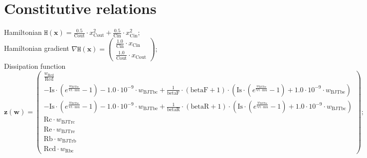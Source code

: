 \documentclass[11pt, oneside]{article}      %
\begin{document}
\section{Constitutive relations}
%
Hamiltonian $ \mathtt{H}(\mathbf{x}) = \frac{0.5}{\mathrm{Cout}} \cdot x_{\mathrm{Cout}}^{2} + \frac{0.5}{\mathrm{Cin}} \cdot x_{\mathrm{Cin}}^{2} ; $ 
%
\\
%
Hamiltonian gradient $ \nabla \mathtt{H}(\mathbf{x}) = \left(\begin{array}{c}\frac{1.0}{\mathrm{Cin}} \cdot x_{\mathrm{Cin}}\\\frac{1.0}{\mathrm{Cout}} \cdot x_{\mathrm{Cout}}\end{array}\right) ; $ 
%
\\
%
Dissipation function $ \mathbf{z}(\mathbf{w}) = \left(\begin{array}{c}\frac{w_{\mathrm{Rcd}}}{\mathrm{Rcd}}\\- \mathrm{Is} \cdot \left(e^{\frac{w_{\mathrm{BJTbc}}}{\mathrm{Vt} \cdot \mathrm{mu}}} - 1\right) - 1.0 \cdot 10^{-9} \cdot w_{\mathrm{BJTbc}} + \frac{1}{\mathrm{betaF}} \cdot \left(\mathrm{betaF} + 1\right) \cdot \left(\mathrm{Is} \cdot \left(e^{\frac{w_{\mathrm{BJTbe}}}{\mathrm{Vt} \cdot \mathrm{mu}}} - 1\right) + 1.0 \cdot 10^{-9} \cdot w_{\mathrm{BJTbe}}\right)\\- \mathrm{Is} \cdot \left(e^{\frac{w_{\mathrm{BJTbe}}}{\mathrm{Vt} \cdot \mathrm{mu}}} - 1\right) - 1.0 \cdot 10^{-9} \cdot w_{\mathrm{BJTbe}} + \frac{1}{\mathrm{betaR}} \cdot \left(\mathrm{betaR} + 1\right) \cdot \left(\mathrm{Is} \cdot \left(e^{\frac{w_{\mathrm{BJTbc}}}{\mathrm{Vt} \cdot \mathrm{mu}}} - 1\right) + 1.0 \cdot 10^{-9} \cdot w_{\mathrm{BJTbc}}\right)\\\mathrm{Rc} \cdot w_{\mathrm{BJTrc}}\\\mathrm{Re} \cdot w_{\mathrm{BJTre}}\\\mathrm{Rb} \cdot w_{\mathrm{BJTrb}}\\\mathrm{Rcd} \cdot w_{\mathrm{Rbc}}\end{array}\right) ; $ 
%
\\
%
\end{document}
